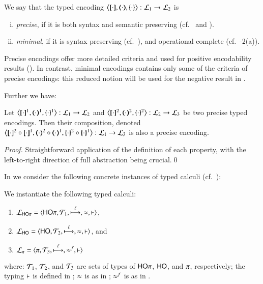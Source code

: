 \begin{definition}\rm
	\label{def:goodenc}
	We say that  the typed encoding 
	$\enco{\map{\cdot}, \mapt{\cdot}, \mapa{\cdot}}: \tyl{L}_1 \to \tyl{L}_2$ is 
%
	\begin{enumerate}[(i)]
		\item	\emph{precise}, if it is both syntax and semantic preserving
			(cf.~ and ).

		\item	\emph{minimal}, if it is syntax preserving 
			(cf.~),
			and operational complete (cf.~-2(a)).
	\end{enumerate}
\end{definition}

Precise encodings offer more detailed criteria and used for positive 
encodability results ().
In contrast, minimal encodings contains only 
some of the criteria of precise encodings:    
this reduced notion will be used 
for the negative result in . 

Further we have:
\begin{proposition}\rm
	\label{prop:enc_composability}
	Let %
	$\enco{\pmap{\cdot}{1}, \tmap{\cdot}{1}, \mapa{\cdot}^{1}}: \tyl{L}_1 \to \tyl{L}_2$
	and 
	$\enco{\pmap{\cdot}{2}, \tmap{\cdot}{2}, \mapa{\cdot}^{2}}: \tyl{L}_2 \to \tyl{L}_3$
	be two precise typed encodings.
	Then their composition, denoted 
	$\enco{\pmap{\cdot}{2} \circ \pmap{\cdot}{1}, \tmap{\cdot}{2} \circ \tmap{\cdot}{1}, \mapa{\cdot}^{2}\circ \mapa{\cdot}^{1}}: \tyl{L}_1 \to \tyl{L}_3$
	is also a precise encoding.
\end{proposition}

\begin{proof}
	Straightforward application of the definition of each property, with the left-to-right direction of
	full abstraction being crucial.\qed
\end{proof}

In  %
we consider the following concrete instances of typed calculi
(cf.~):


\begin{definition}\rm
	We instantiate the following typed calculi:
%
	\begin{enumerate}[1.]
		\item	$\mathcal{L}_{\mathsf{HO}\pi}=\langle \mathsf{HO}\pi, {\cal{T}}_1, \stackrel{\ell}{\longmapsto}, \approx, \vdash \rangle$,
		\item	$\mathcal{L}_{\mathsf{HO}}=\langle \mathsf{HO}, {\cal{T}}_2, \stackrel{\ell}{\longmapsto}, \approx, \vdash \rangle$, and
		\item	$\mathcal{L}_{\pi}=\langle \pi, {\cal{T}}_3, \stackrel{\ell}{\longmapsto}, \approx^{f}, \vdash \rangle$ 
	\end{enumerate}
%
	where: 
	${\cal{T}}_1$, ${\cal{T}}_2$, 
	and ${\cal{T}}_3$
	are sets of types of $\mathsf{HO}\pi$, $\mathsf{HO}$, and $\pi$, respectively;
	the typing $\vdash$ is defined in 
	;  
	$\approx$ is as in ; 
	$\approx^{f}$ is as in .
\end{definition}


